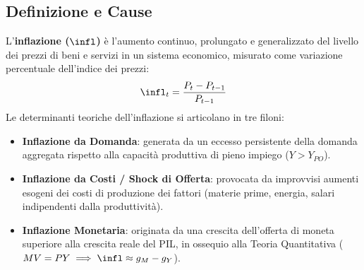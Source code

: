 \subsection{Definizione e Cause}
L'\textbf{inflazione ($\infl$)} è l'aumento continuo, prolungato e generalizzato del livello dei prezzi di beni e servizi in un sistema economico, misurato come variazione percentuale dell'indice dei prezzi:
\begin{equation}
    \infl_t = \frac{P_t - P_{t-1}}{P_{t-1}}
\end{equation}
Le determinanti teoriche dell'inflazione si articolano in tre filoni:
\begin{itemize}
    \item \textbf{Inflazione da Domanda}: generata da un eccesso persistente della domanda aggregata rispetto alla capacità produttiva di pieno impiego ($Y > Y_{PO}$).
    \item \textbf{Inflazione da Costi / Shock di Offerta}: provocata da improvvisi aumenti esogeni dei costi di produzione dei fattori (materie prime, energia, salari indipendenti dalla produttività).
    \item \textbf{Inflazione Monetaria}: originata da una crescita dell'offerta di moneta superiore alla crescita reale del PIL, in ossequio alla Teoria Quantitativa ($M V = P Y \implies \infl \approx g_M - g_Y$).
\end{itemize}

